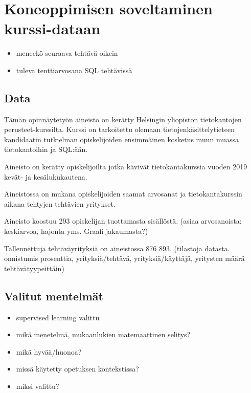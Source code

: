 \documentclass[finnish,twoside,openright]{HYgraduMLDS}
\begin{document}
\chapter{Koneoppimisen soveltaminen kurssi-dataan}

\begin{itemize}
    \item meneekö seuraava tehtävä oikein
    \item tuleva tenttiarvosana SQL tehtävissä
\end{itemize}

\section{Data}

Tämän opinnäytetyön aineisto on kerätty Helsingin yliopiston tietokantojen perusteet-kurssilta\cite{tikape2019}. Kurssi on tarkoitettu olemaan tietojenkäsittelytieteen kandidaatin tutkielman opiskelijoiden ensimmäinen kosketus muun muassa tietokantoihin ja SQL:ään\cite{tikape2019}.

Aineisto on kerätty opiskelijoilta jotka kävivät tietokantakurssia vuoden 2019 kevät- ja kesälukukautena. 

Aineistossa on mukana opiskelijoiden saamat arvosanat ja tietokantakurssin aikana tehtyjen tehtävien yritykset.

Aineisto koostuu 293 opiskelijan tuottamasta sisällöstä. (asiaa  arvosanoista: keskiarvoa, hajonta yms. Graafi jakaumasta?)

Tallennettuja tehtäväyrityksiä on aineistossa 876 893. (tilastoja datasta. onnistumis prosenttia, yrityksiä/tehtävä,  yrityksiä/käyttäjä, yritysten määrä tehtävätyypeittäin)


\section{Valitut mentelmät}

\begin{itemize}
    \item supervised learning valittu
\end{itemize}

\begin{itemize}
    \item mikä menetelmä, mukaanlukien matemaattinen selitys?
    \item mikä hyvää/huonoa?
    \item missä käytetty opetuksen kontekstissa?
    \item miksi valittu?
\end{itemize}
\end{document}
